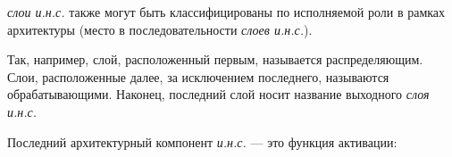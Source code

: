 \textit{слои и.н.с.} также могут быть классифицированы по исполняемой роли в рамках архитектуры (место в последовательности \textit{слоев и.н.с.}).

Так, например, слой, расположенный первым, называется распределяющим. Слои, расположенные далее, за исключением последнего, называются обрабатывающими. Наконец, последний слой носит название выходного \textit{слоя и.н.с.}

Последний архитектурный компонент \textit{и.н.с.} --- это функция активации:

\begin{SCn}
\end{SCn}

